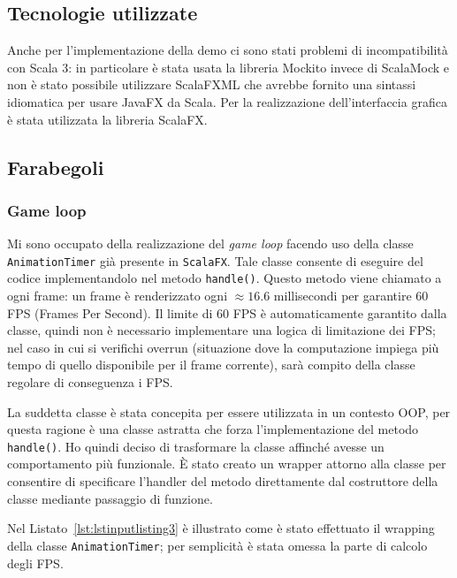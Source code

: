\subsection{Tecnologie utilizzate}\label{sec:demo-tecnologie-utilizzate}
Anche per l'implementazione della demo ci sono stati problemi di incompatibilità con Scala 3:
in particolare è stata usata la libreria Mockito\cite{mockito} invece di ScalaMock e non è stato possibile utilizzare ScalaFXML
che avrebbe fornito una sintassi idiomatica per usare JavaFX da Scala\@.
Per la realizzazione dell'interfaccia grafica è stata utilizzata la libreria ScalaFX\cite{scalafx}\@.

\subsection{Farabegoli}\label{subsec:demo-farabegoli}
\subsubsection{Game loop}
Mi sono occupato della realizzazione del \textit{game loop} facendo uso della classe \texttt{AnimationTimer} già
presente in \texttt{ScalaFX}.
Tale classe consente di eseguire del codice implementandolo nel metodo \texttt{handle()}.
Questo metodo viene chiamato a ogni frame: un frame è renderizzato ogni $\approx16.6$ millisecondi per garantire 60 FPS
(Frames Per Second).
Il limite di 60 FPS è automaticamente garantito dalla classe, quindi non è necessario implementare una logica di
limitazione dei FPS\@; nel caso in cui si verifichi overrun (situazione dove la computazione impiega più tempo di
quello disponibile per il frame corrente), sarà compito della classe regolare di conseguenza i FPS\@.

La suddetta classe è stata concepita per essere utilizzata in un contesto OOP, per questa ragione è una classe astratta
che forza l'implementazione del metodo \texttt{handle()}.
Ho quindi deciso di trasformare la classe affinché avesse un comportamento più funzionale.
È stato creato un wrapper attorno alla classe per consentire di specificare l'handler del metodo direttamente
dal costruttore della classe mediante passaggio di funzione.

Nel Listato~\ref{lst:lstinputlisting3} è illustrato come è stato effettuato il wrapping della classe
\texttt{AnimationTimer}; per semplicità è stata omessa la parte di calcolo degli FPS\@.



